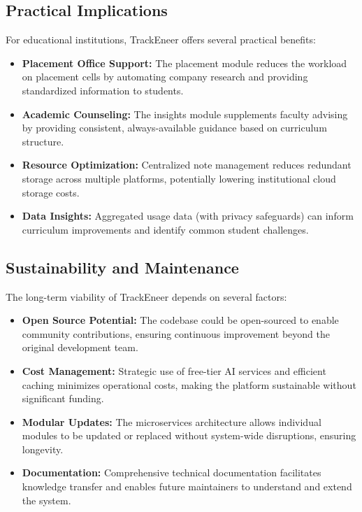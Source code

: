 \documentclass[12pt]{article}
\begin{document}
\subsection{Practical Implications}
For educational institutions, TrackEneer offers several practical benefits:

\begin{itemize}
    \item \textbf{Placement Office Support:} The placement module reduces the workload on placement cells by automating company research and providing standardized information to students.
    
    \item \textbf{Academic Counseling:} The insights module supplements faculty advising by providing consistent, always-available guidance based on curriculum structure.
    
    \item \textbf{Resource Optimization:} Centralized note management reduces redundant storage across multiple platforms, potentially lowering institutional cloud storage costs.
    
    \item \textbf{Data Insights:} Aggregated usage data (with privacy safeguards) can inform curriculum improvements and identify common student challenges.
\end{itemize}

\subsection{Sustainability and Maintenance}
The long-term viability of TrackEneer depends on several factors:

\begin{itemize}
    \item \textbf{Open Source Potential:} The codebase could be open-sourced to enable community contributions, ensuring continuous improvement beyond the original development team.
    
    \item \textbf{Cost Management:} Strategic use of free-tier AI services and efficient caching minimizes operational costs, making the platform sustainable without significant funding.
    
    \item \textbf{Modular Updates:} The microservices architecture allows individual modules to be updated or replaced without system-wide disruptions, ensuring longevity.
    
    \item \textbf{Documentation:} Comprehensive technical documentation facilitates knowledge transfer and enables future maintainers to understand and extend the system.
\end{itemize}
\end{document}
